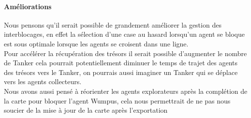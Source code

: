 \documentclass[10pt]{article}
\newcommand\tab[1][0.65cm]{\hspace*{#1}}
\begin{document}
\paragraph{Améliorations}  
Nous pensons qu'il serait possible de grandement améliorer la gestion des interblocages, en effet la sélection d'une case au hasard lorsqu'un agent se bloque est sous optimale lorsque les agents se croisent dans une ligne.\\
\tab Pour accélérer la récupération des trésors il serait possible d'augmenter le nombre de Tanker cela pourrait potentiellement diminuer le temps de trajet des agents des trésors vers le Tanker, on pourrais aussi imaginer un Tanker qui se déplace vers les agents collecteurs.\\
\tab Nous avons aussi pensé à réorienter les agents explorateurs après la complétion de la carte pour bloquer l'agent Wumpus, cela nous permettrait de ne pas nous soucier de la mise à jour de la carte après l'exportation\\ 


	
\end{document}
